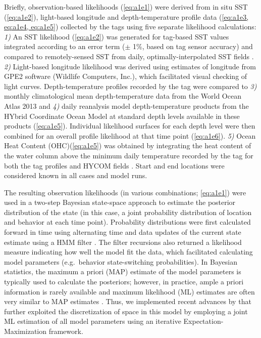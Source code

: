 Briefly, observation-based likelihoods (\cref{eq:a1e1}) were derived from in
situ SST (\cref{eq:a1e2}), light-based longitude and depth-temperature profile
data (\cref{eq:a1e3, eq:a1e4, eq:a1e5}) collected by the tags using five separate
likelihood calculations: \emph{1)} An SST likelihood (\cref{eq:a1e2}) was
generated for tag-based SST values integrated according to an error term
($\pm$ 1\%, based on tag sensor accuracy) and compared to
remotely-sensed SST from daily, optimally-interpolated SST fields
\citep[OI-SST, 0.25$^{\circ}$ resolution;][]{Banzon2016}. \emph{2)} Light-based
longitude likelihood was derived using estimates of longitude from GPE2
software (Wildlife Computers, Inc.), which facilitated visual checking
of light curves. Depth-temperature profiles recorded by the tag were
compared to \emph{3)} monthly climatological mean depth-temperature data
from the World Ocean Atlas 2013 \citep[WOA, 0.25$^{\circ}$
resolution;][]{Locarnini2013} and \emph{4)} daily reanalysis model
depth-temperature products from the HYbrid Coordinate Ocean Model
\citep[HYCOM, 0.08$^{\circ}$ resolution;][]{Chassignet2007} at standard depth
levels available in these products (\cref{eq:a1e5}). Individual likelihood
surfaces for each depth level were then combined for an overall profile
likelihood at that time point (\cref{eq:a1e6}). \emph{5)} Ocean Heat Content
(OHC)(\cref{eq:a1e5}) was obtained by integrating the heat content of the water
column above the minimum daily temperature recorded by the tag for both
the tag profiles and HYCOM fields \citep[\cref{eq:a1e4};][]{Luo2015}. Start and
end locations were considered known in all cases and model runs.

The resulting observation likelihoods (in various combinations; \cref{eq:a1e1})
were used in a two-step Bayesian state-space approach to estimate the
posterior distribution of the state (in this case, a joint probability
distribution of location and behavior at each time point). Probability
distributions were first calculated forward in time using alternating
time and data updates of the current state estimate using a HMM filter
\citep[for a detailed methodology of the HMM filter see Appendix 2
in][]{Pedersen2011}. The filter recursions also returned a likelihood
measure indicating how well the model fit the data, which facilitated
calculating model parameters (e.g.~behavior state-switching
probabilities). In Bayesian statistics, the maximum a priori (MAP)
estimate of the model parameters is typically used to calculate the
posteriors; however, in practice, ample a priori information is rarely
available and maximum likelihood (ML) estimates are often very similar
to MAP estimates \citep{Jonsen2005}. Thus, we implemented recent
advances by \citet{Woillez2016} that further exploited the
discretization of space in this model by employing a joint ML estimation
of all model parameters using an iterative Expectation-Maximization
framework.

